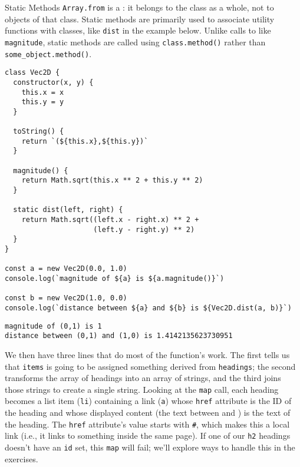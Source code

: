 \begin{aside}{Static Methods}
  \texttt{Array.from} is a :
  it belongs to the class as a whole,
  not to objects of that class.
  Static methods are primarily used to associate utility functions with classes,
  like \texttt{dist} in the example below.
  Unlike calls to  like \texttt{magnitude},
  static methods are called using \texttt{class.method()}
  rather than \texttt{some\_object.method()}.

\begin{verbatim}
class Vec2D {
  constructor(x, y) {
    this.x = x
    this.y = y
  }

  toString() {
    return `(${this.x},${this.y})`
  }

  magnitude() {
    return Math.sqrt(this.x ** 2 + this.y ** 2)
  }

  static dist(left, right) {
    return Math.sqrt((left.x - right.x) ** 2 +
                     (left.y - right.y) ** 2)
  }
}

const a = new Vec2D(0.0, 1.0)
console.log(`magnitude of ${a} is ${a.magnitude()}`)

const b = new Vec2D(1.0, 0.0)
console.log(`distance between ${a} and ${b} is ${Vec2D.dist(a, b)}`)
\end{verbatim}

\begin{verbatim}
magnitude of (0,1) is 1
distance between (0,1) and (1,0) is 1.4142135623730951
\end{verbatim}
\end{aside}

We then have three lines that do most of the function's work.
The first tells us that \texttt{items} is going to be assigned
something derived from \texttt{headings};
the second transforms the array of headings into an array of strings,
and the third joins those strings to create a single string.
Looking at the \texttt{map} call,
each heading becomes a list item (\texttt{li})
containing a link (\texttt{a})
whose \texttt{href} attribute is the ID of the heading
and whose displayed content (the text between \texttt{} and \texttt{})
is the text of the heading.
The \texttt{href} attribute's value starts with \texttt{\#},
which makes this a local link
(i.e., it links to something inside the same page).
If one of our \texttt{h2} headings doesn't have an \texttt{id} set,
this \texttt{map} will fail;
we'll explore ways to handle this in the exercises.


